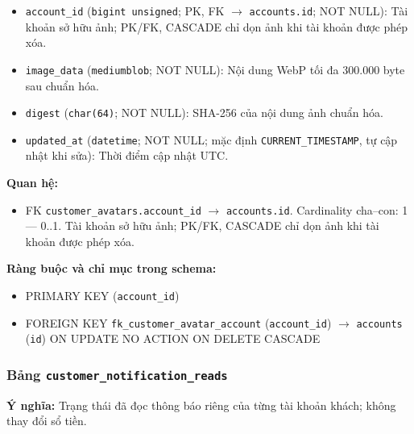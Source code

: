 \begin{itemize}

\item \texttt{account\_id} (\texttt{bigint unsigned}; PK, FK $\rightarrow$ \texttt{accounts.id}; NOT NULL): Tài khoản sở hữu ảnh; PK/FK, CASCADE chỉ dọn ảnh khi tài khoản được phép xóa.

\item \texttt{image\_data} (\texttt{mediumblob}; NOT NULL): Nội dung WebP tối đa 300.000 byte sau chuẩn hóa.

\item \texttt{digest} (\texttt{char(64)}; NOT NULL): SHA-256 của nội dung ảnh chuẩn hóa.

\item \texttt{updated\_at} (\texttt{datetime}; NOT NULL; mặc định \texttt{CURRENT\_TIMESTAMP}, tự cập nhật khi sửa): Thời điểm cập nhật UTC.

\end{itemize}

\textbf{Quan hệ:}

\begin{itemize}

\item FK \texttt{customer\_avatars.account\_id} $\rightarrow$ \texttt{accounts.id}. Cardinality cha--con: 1 — 0..1. Tài khoản sở hữu ảnh; PK/FK, CASCADE chỉ dọn ảnh khi tài khoản được phép xóa.

\end{itemize}

\textbf{Ràng buộc và chỉ mục trong schema:}

\begin{itemize}

\item PRIMARY KEY (\texttt{account\_id})

\item FOREIGN KEY \texttt{fk\_customer\_avatar\_account} (\texttt{account\_id}) $\rightarrow$ \texttt{accounts} (\texttt{id}) ON UPDATE NO ACTION ON DELETE CASCADE

\end{itemize}

\subsubsection{Bảng \texttt{customer\_notification\_reads}}

\textbf{Ý nghĩa:} Trạng thái đã đọc thông báo riêng của từng tài khoản khách; không thay đổi sổ tiền.\par

